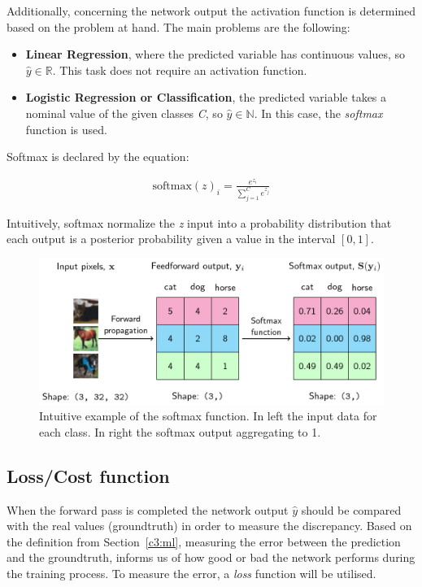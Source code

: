 Additionally, concerning the network output the activation function is determined based on the problem at hand. The main problems are the following:

\begin{itemize}
 \item \textbf{Linear Regression}, where the predicted variable has continuous values, so $\hat{y} \in \mathbb{R}$. This task does not require an activation function.
 \item \textbf{Logistic Regression or Classification}, the predicted variable takes a nominal value of the given classes \textit{C}, so $\hat{y} \in \mathbb{N}$. In this case, the \textit{softmax} function is used.
\end{itemize}

Softmax is declared by the equation:

\begin{ceqn}
\label{c3:softmasx_eq}
\begin{align}
  \text{softmax}(z)_i = \frac{e^{z_i}}{\sum_{j=1}^{C} e^{z_j}}
\end{align}
\end{ceqn}

Intuitively, softmax normalize the \textit{z} input into a probability distribution that each output is a posterior probability given a value in the interval $[0,1]$.

\begin{figure}[h!]
    \centering  
    \includegraphics[width=.7\textwidth]{figures/chap3/ml/softmax}
    \caption{Intuitive example of the softmax function. In left the input data for each class. In right the softmax output aggregating to 1.}
    \label{c3:softmax}
\end{figure}

\subsection{Loss/Cost function}

When the forward pass is completed the network output $\hat{y}$ should be compared with the real values (groundtruth) in order to measure the discrepancy. Based on the definition from Section~\ref{c3:ml}, measuring the error between the prediction and the groundtruth, informs us of how good or bad the network performs during the training process. To measure the error, a \textit{loss} function will be utilised.

